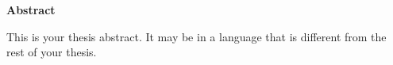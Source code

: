 \begin{otherlanguage}{UKenglish}

  \begin{center}
    \textbf{\sffamily\bfseries\upshape\Large Abstract}
  \end{center}

  
  This is your thesis abstract. It may be in a language that is
  different from the rest of your thesis.

\end{otherlanguage}